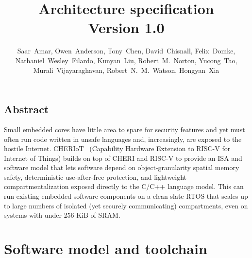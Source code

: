 \documentclass[12pt,letterpaper,twoside,openright,fleqn]{report}
\begin{document}
\title{\cherimcu{} Architecture specification\\
  Version 1.0}
\author{
  \parbox{\linewidth}{\centering%
    Saar~Amar,
    Owen~Anderson,
    Tony~Chen,
    David~Chisnall,
    Felix~Domke,
    Nathaniel~Wesley~Filardo,
    Kunyan~Liu,
    Robert~M.~Norton,
    Yucong~Tao,
    Murali~Vijayaraghavan,
    Robert~N.~M.~Watson,
    Hongyan~Xia
  }%
}

\begin{minipage}[h]{\textwidth}
  \vspace{-.2cm}
  \maketitle
\end{minipage}

\normalsize


\clearpage

\chapter*{Abstract}

Small embedded cores have little area to spare for security features and yet must often run code written in unsafe languages and, increasingly, are exposed to the hostile Internet.
CHERIoT  (Capability Hardware Extension to RISC-V for Internet of Things) builds on top of CHERI and RISC-V to provide an ISA and software model that lets software depend on object-granularity spatial memory safety, deterministic use-after-free protection, and lightweight compartmentalization exposed directly to the C/C++ language model.
This can run existing embedded software components on a clean-slate RTOS that scales up to large numbers of isolated (yet securely communicating) compartments, even on systems with under 256 KiB of SRAM.

\clearpage



\clearpage



\clearpage



\clearpage

\tableofcontents

\part{Software model and toolchain}
\label{part:sw}
\end{document}
